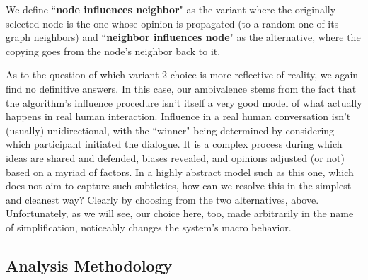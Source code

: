 We define ``\textbf{node influences neighbor}" as the variant where the
originally selected node is the one whose opinion is propagated (to a random
one of its graph neighbors) and ``\textbf{neighbor influences node}" as the
alternative, where the copying goes from the node's neighbor back to it.

As to the question of which variant 2 choice is more reflective of reality, we
again find no definitive answers. In this case, our ambivalence stems from the
fact that the algorithm's influence procedure isn't itself a very good model
of what actually happens in real human interaction. Influence in a real human
conversation isn't (usually) unidirectional, with the ``winner" being
determined by considering which participant initiated the dialogue. It is a
complex process during which ideas are shared and defended, biases revealed, 
and opinions adjusted (or not) based on a myriad of factors. In a highly
abstract model such as this one, which does not aim to capture such
subtleties, how can we resolve this in the simplest and cleanest way? Clearly
by choosing from the two alternatives, above. Unfortunately, as we will see,
our choice here, too, made arbitrarily in the name of simplification,
noticeably changes the system's macro behavior.

\subsection{Analysis Methodology}






